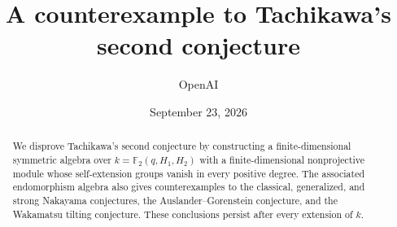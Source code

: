 \documentclass[11pt]{article}
\title{A counterexample to Tachikawa's second conjecture}
\author{OpenAI}
\date{September 23, 2026}
\theoremstyle{definition}
\theoremstyle{remark}
\numberwithin{equation}{section}
\begin{document}
\maketitle
\begin{abstract}
We disprove Tachikawa's second conjecture by constructing a
finite-dimensional symmetric algebra over $k=\mathbb F_2(q,H_1,H_2)$
with a finite-dimensional nonprojective module whose self-extension
groups vanish in every positive degree. The associated endomorphism
algebra also gives
counterexamples to the classical, generalized, and strong Nakayama
conjectures, the Auslander--Gorenstein conjecture, and the Wakamatsu
tilting conjecture. These conclusions persist after every extension of $k$.
\end{abstract}








\clearpage


\end{document}
